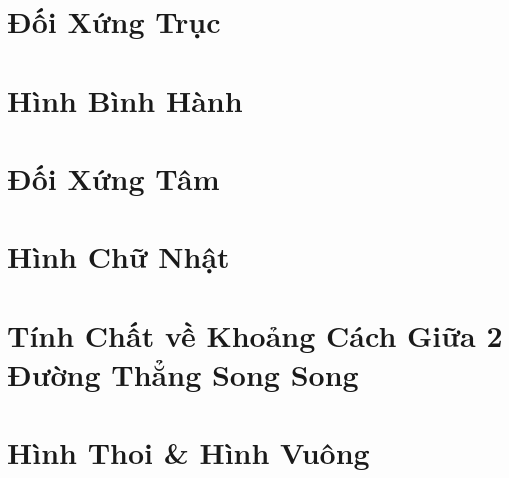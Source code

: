 \documentclass{article}
\numberwithin{equation}{section}
\begin{document}

\section{Đối Xứng Trục}


\section{Hình Bình Hành}


\section{Đối Xứng Tâm}


\section{Hình Chữ Nhật}


\section{Tính Chất về Khoảng Cách Giữa 2 Đường Thẳng Song Song}


\section{Hình Thoi \& Hình Vuông}


\printbibliography[heading=bibintoc]
	
\end{document}
